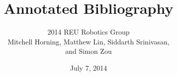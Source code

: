 \documentclass[12pt]{article}
\begin{document}
\title{Annotated Bibliography}
\author{2014 REU Robotics Group \\ Mitchell Horning, Matthew Lin, Siddarth Srinivasan,\\ and Simon Zou}
\date{July 7, 2014}

\maketitle

\nocite{*}



\end{document}
